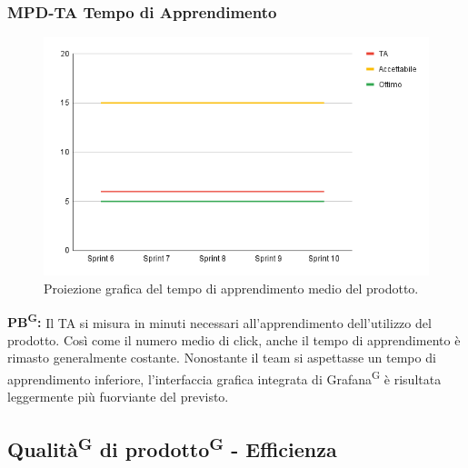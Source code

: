 \documentclass[8pt]{article}
\newcommand{\glossterm}[1]{#1\textsuperscript{G}} %
\begin{document}
\subsubsection{MPD-TA Tempo di Apprendimento}
\begin{figure}[h!]
    \centering
    \includegraphics[width=1\textwidth]{images_pdq/TA.png}
    \caption{Proiezione grafica del tempo di apprendimento medio del prodotto.}
    \label{fig:Proiezione grafica del tempo di apprendimento medio del prodotto}
\end{figure}
\textbf{\glossterm{PB}:} Il TA si misura in minuti necessari all'apprendimento dell'utilizzo del prodotto. Così come il numero medio di click, anche il tempo di apprendimento è rimasto generalmente costante. Nonostante il team si aspettasse un tempo di apprendimento inferiore, l'interfaccia grafica integrata di \glossterm{Grafana} è risultata leggermente più fuorviante del previsto.
\clearpage
\subsection{\glossterm{Qualità} di \glossterm{prodotto} - Efficienza}
\end{document}
